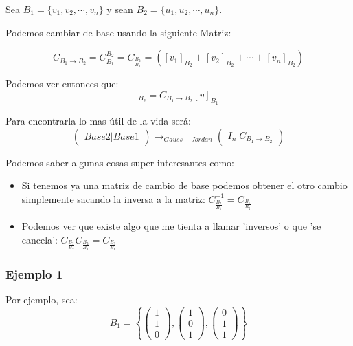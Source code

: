 \documentclass[12pt]{report}							    %
\begin{document}
        Sea $B_1 = \{v_1,v_2, \cdots, v_n\}$ y sean  $B_2 = \{u_1,u_2, \cdots, u_n\}$.

        Podemos cambiar de base usando la siguiente Matriz:

        \begin{equation*}
            C_{B_1 \to B_2}= C_{B_1}^{B_2} = C_{\frac{B_2}{B_1}} = \left( [v_1]_{B_2} + [v_2]_{B_2} + \cdots + [v_n]_{B_2}   \right)
        \end{equation*}

        Podemos ver entonces que:
        \begin{equation*}
            [v]_{B_2} = C_{B_1 \to B_2} [v]_{B_1}
        \end{equation*}

        Para encontrarla lo mas útil de la vida será:
        \begin{equation}
            \begin{pmatrix}  Base 2  \vert Base 1 \end{pmatrix} \to_{Gauss-Jordan}
            \begin{pmatrix}  I_n  \vert C_{B_1 \to B_2} \end{pmatrix}
        \end{equation}


        Podemos saber algunas cosas super interesantes como:
        \begin{itemize}
            \item Si tenemos ya una matriz de cambio de base podemos obtener el otro cambio simplemente sacando la inversa a la matriz:
            $ C^{-1}_{\frac{B_2}{B_1}} = C_{\frac{B_1}{B_2}} $
            
            \item Podemos ver que existe algo que me tienta a llamar 'inversos' o que 'se cancela': 
            $ C_{\frac{B_3}{B_2}} C_{\frac{B_2}{B_1}} = C_{\frac{B_3}{B_1}} $

        \end{itemize}

        \subsubsection{Ejemplo 1}

        Por ejemplo, sea:
        \begin{equation*}
            B_1 = \left\{
                \begin{pmatrix} 1 \\ 1 \\0 \end{pmatrix}, \begin{pmatrix} 1 \\ 0 \\1 \end{pmatrix},
                \begin{pmatrix} 0 \\ 1 \\1 \end{pmatrix}
            \right\}
        \end{equation*}
\end{document}
